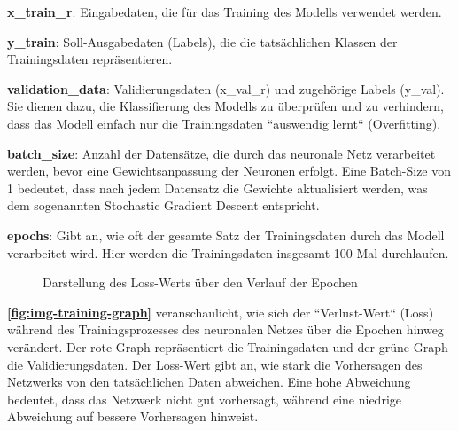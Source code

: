 \begin{mdframed}

\textbf{x\_train\_r}: Eingabedaten, die für das Training des Modells verwendet werden.

\textbf{y\_train}: Soll-Ausgabedaten (Labels), die die tatsächlichen Klassen der Trainingsdaten repräsentieren.

\textbf{validation\_data}: Validierungsdaten (x\_val\_r) und zugehörige Labels (y\_val). Sie dienen dazu, die Klassifierung des Modells zu überprüfen und zu verhindern, dass das Modell einfach nur die Trainingsdaten ``auswendig lernt`` (Overfitting).

\textbf{batch\_size}: Anzahl der Datensätze, die durch das neuronale Netz verarbeitet werden, bevor eine Gewichtsanpassung der Neuronen erfolgt. Eine Batch-Size von 1 bedeutet, dass nach jedem Datensatz die Gewichte aktualisiert werden, was dem sogenannten Stochastic Gradient Descent entspricht.

\textbf{epochs}: Gibt an, wie oft der gesamte Satz der Trainingsdaten durch das Modell verarbeitet wird. Hier werden die Trainingsdaten insgesamt 100 Mal durchlaufen.

\end{mdframed}

\begin{figure} %
	\vspace{-20pt + 0.02\textwidth}
	\hspace{0.02\textwidth} %
	\caption{Darstellung des Loss-Werts über den Verlauf der Epochen}
	\label{fig:img-training-graph}
\end{figure}

\textbf{\autoref{fig:img-training-graph}} veranschaulicht, wie sich der ``Verlust-Wert`` (Loss) während des Trainingsprozesses des neuronalen Netzes über die Epochen hinweg verändert. Der rote Graph repräsentiert die Trainingsdaten und der grüne Graph die Validierungsdaten. Der Loss-Wert gibt an, wie stark die Vorhersagen des Netzwerks von den tatsächlichen Daten abweichen. Eine hohe Abweichung bedeutet, dass das Netzwerk nicht gut vorhersagt, während eine niedrige Abweichung auf bessere Vorhersagen hinweist.

